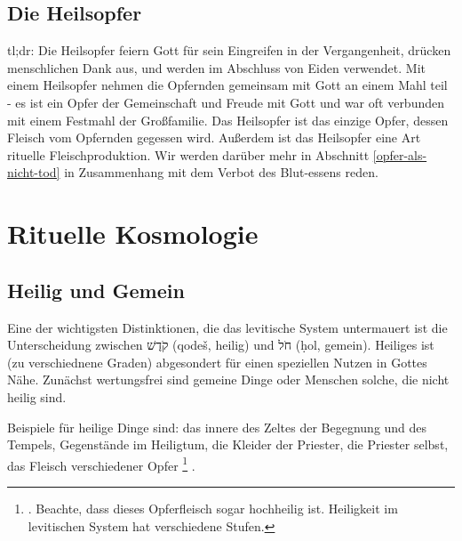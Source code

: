 
\section{Die Heilsopfer}
tl;dr:
Die Heilsopfer feiern Gott für sein Eingreifen in der Vergangenheit, drücken menschlichen Dank aus, und werden im Abschluss von Eiden verwendet.
Mit einem Heilsopfer nehmen die Opfernden gemeinsam mit Gott an einem Mahl teil -
es ist ein Opfer der Gemeinschaft und Freude mit Gott und war oft verbunden mit einem Festmahl der Großfamilie.
Das Heilsopfer ist das einzige Opfer, dessen Fleisch vom Opfernden gegessen wird.
Außerdem ist das Heilsopfer eine Art rituelle Fleischproduktion.
Wir werden darüber mehr in Abschnitt \ref{opfer-als-nicht-tod} in Zusammenhang mit dem Verbot des Blut-essens reden.

\chapter{Rituelle Kosmologie}
\section{Heilig und Gemein}
Eine der wichtigsten Distinktionen, die das levitische System untermauert ist die Unterscheidung zwischen קֹדֶשׁ (qodeš, heilig) und חֹל (ḥol, gemein).
Heiliges ist (zu verschiednene Graden) abgesondert für einen speziellen Nutzen in Gottes Nähe.
Zunächst wertungsfrei sind gemeine Dinge oder Menschen solche, die nicht heilig sind.

Beispiele für heilige Dinge sind: das innere des Zeltes der Begegnung und des Tempels,
Gegenstände im Heiligtum,
die Kleider der Priester,
die Priester selbst,
das Fleisch verschiedener Opfer
\footnote{. Beachte, dass dieses Opferfleisch sogar hochheilig ist. Heiligkeit im levitischen System hat verschiedene Stufen.}
.

